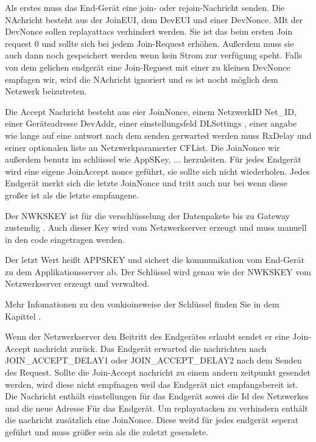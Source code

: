 \documentclass[a4paper,12pt]{article}
\begin{document}
            
            Als erstes muss das End-Gerät eine join- oder rejoin-Nachricht senden. Die NAchricht besteht aus der JoinEUI, dem DevEUI und einer DevNonce. MIt der DevNonce sollen replayattacs verhindert werden. Sie ist das beim ersten Join request 0 und sollte sich bei jedem Join-Request erhöhen. Außerdem muss sie auch dann noch gespeichert werden wenn kein Strom zur verfügung speht. Falls von dem gelichen endgerät eine Join-Reguest mit einer zu kleinen DevNonce empfagen wir, wird die NAchricht ignoriert und es ist nocht möglich dem Netzwerk beizutreten.

            Die Accept Nachricht besteht aus eier JoinNonce, einem NetzwerkID Net\_ID, einer Geräteadresse DevAddr, einer einstellungsfeld DLSettings , einer angabe wie lange auf eine antwort nach dem senden gerwarted werden muss RxDelay und eriner optionalen liste an Netzwerkparamerter CFList. Die JoinNonce wir außerdem benutz im schlüssel wie AppSKey, ... herzuleiten.
            Für jedes Endgerät wird eine eigene JoinAccept nonce geführt, sie sollte sich nicht wiederholen. Jedes Endgerät merkt sich die letzte JoinNonce und tritt auch nur bei wenn diese großer ist als die letzte empfangene.

            Der NWKSKEY ist für die verschlüsselung der Datenpakete bis zu Gateway zustendig . Auch dieser Key wird vom Netzwerkserver erzeugt und muss manuell in den code eingetragen werden.
        
            Der letzt Wert heißt APPSKEY und sichert die kommunikation vom End-Gerät zu dem Applikationsserver ab. Der Schlüssel wird genau wie der NWKSKEY vom Netzwerkserver erzeugt und verwalted.
        
            Mehr Infomationen zu den vonkioinsweise der Schlüssel finden Sie in dem Kapittel .


            Wenn der Netzwerkserver den Beitritt des Endgerätes erlaubt sendet er eine Join-Accept nachricht zurück. Das Endgerät erwarted die nachrichten nach JOIN\_ACCEPT\_DELAY1 oder JOIN\_ACCEPT\_DELAY2 nach dem Senden des Request. Sollte die Join-Accept nachricht zu einem andern zeitpunkt gesendet werden, wird diese nicht empfnagen weil das Endgerät nict empfangsbereit ist.
            Die Nachricht enthält einstellungen für das Endgerät sowei die Id des Netzwerkes und die neue Adresse Für das Endgerät. Um replayatacken zu verhindern enthält die nachricht zusätzlich eine JoinNonce. Diese weitd für jedes endgerät seperat geführt und muss größer sein als die zuletzt gesendete.
            
\end{document}
